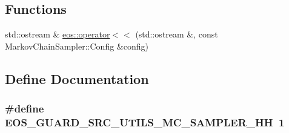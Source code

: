 \subsection*{Functions}
\begin{DoxyCompactItemize}
\item 
std::ostream \& \hyperlink{namespaceeos_a7642c201b3971d5a2d8e71b6d25cd339}{eos::operator$<$$<$} (std::ostream \&, const MarkovChainSampler::Config \&config)
\end{DoxyCompactItemize}


\subsection{Define Documentation}
\hypertarget{markov__chain__sampler_8hh_a564984576aa31b9ed76d28c2b0bd2b2f}{
\subsubsection[{EOS\_\-GUARD\_\-SRC\_\-UTILS\_\-MC\_\-SAMPLER\_\-HH}]{\setlength{\rightskip}{0pt plus 5cm}\#define EOS\_\-GUARD\_\-SRC\_\-UTILS\_\-MC\_\-SAMPLER\_\-HH~1}}
\label{markov__chain__sampler_8hh_a564984576aa31b9ed76d28c2b0bd2b2f}
